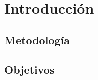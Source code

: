 \cleardoublepage

\chapter{Introducción}
\label{makereference}

\section{Metodología}

\section{Objetivos}

\vspace{1cm}